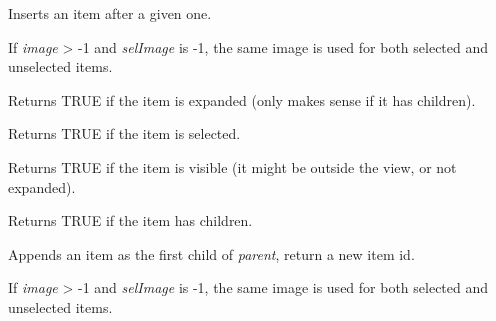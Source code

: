 
Inserts an item after a given one.

If {\it image} > -1 and {\it selImage} is -1, the same image is used for
both selected and unselected items.

\label{wxtreectrlisexpanded}


Returns TRUE if the item is expanded (only makes sense if it has children).

\label{wxtreectrlisselected}


Returns TRUE if the item is selected.

\label{wxtreectrlisvisible}


Returns TRUE if the item is visible (it might be outside the view, or not expanded).

\label{wxtreectrlitemhaschildren}


Returns TRUE if the item has children.

\label{wxtreectrlprependitem}


Appends an item as the first child of {\it parent}, return a new item id.

If {\it image} > -1 and {\it selImage} is -1, the same image is used for
both selected and unselected items.

\label{wxtreectrlscrollto}



